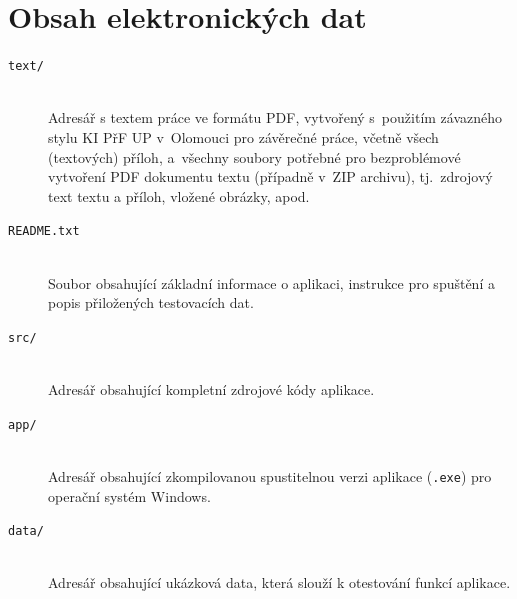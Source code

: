\documentclass[
program=itk,
biblatex,
language=czech,
font=sans,
figures=true,
tables=false,
sourcecodes=false,
glossaries,
index
]{kidiplom}
\begin{document}
\appendix

\section{Obsah elektronických dat}
\begin{description}

\item[\texttt{text/}] \hfill \\
  Adresář s textem práce ve formátu PDF, vytvořený s~použitím
  závazného stylu KI PřF UP v~Olomouci pro závěrečné práce, včetně
  všech (textových) příloh, a~všechny soubory potřebné pro
  bezproblémové vytvoření PDF dokumentu textu (případně v~ZIP
  archivu), tj.~zdrojový text textu a příloh, vložené obrázky, apod.

\item[\texttt{README.txt}] \hfill \\
  Soubor obsahující základní informace o aplikaci, instrukce pro spuštění a popis přiložených testovacích dat.

\item[\texttt{src/}] \hfill \\
    Adresář obsahující kompletní zdrojové kódy aplikace.

\item[\texttt{app/}] \hfill \\
    Adresář obsahující zkompilovanou spustitelnou verzi aplikace (\texttt{.exe}) pro operační systém Windows.

\item[\texttt{data/}] \hfill \\
    Adresář obsahující ukázková data, která slouží k otestování funkcí aplikace.
\end{description}
\printbibliography
\end{document}
